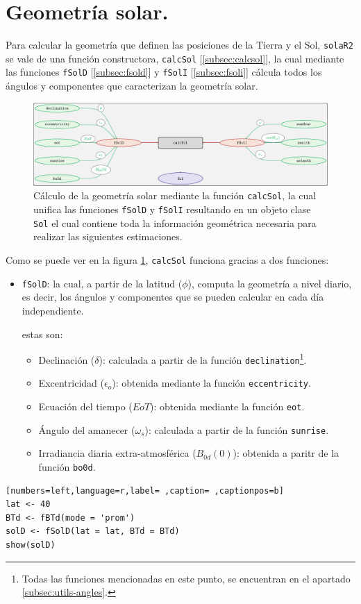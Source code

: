 \section{Geometría solar.}
\label{sec:org38b25ae}
\label{sec:geometria-solar}
Para calcular la geometría que definen las posiciones de la Tierra y el Sol, \texttt{solaR2} se vale de una función constructora, \texttt{calcSol} [\ref{subsec:calcsol}], la cual mediante las funciones \texttt{fSolD} [\ref{subsec:fsold}] y \texttt{fSolI} [\ref{subsec:fsoli}] cálcula todos los ángulos y componentes que caracterizan la geometría solar.
\begin{figure}[]
\centering
\includegraphics[keepaspectratio,width=\textwidth,height=0.5\textheight]{figuras/calcSol.pdf}
\caption{Cálculo de la geometría solar mediante la función \texttt{calcSol}, la cual unifica las funciones \texttt{fSolD} y \texttt{fSolI} resultando en un objeto clase \texttt{Sol} el cual contiene toda la información geométrica necesaria para realizar las siguientes estimaciones. \label{fig:calcSol}}
\end{figure}
Como se puede ver en la figura \ref{fig:calcSol}, \texttt{calcSol} funciona gracias a dos funciones:
\begin{itemize}
\item \texttt{fSolD}: la cual, a partir de la latitud (\(\phi\)), computa la geometría a nivel diario, es decir, los ángulos y componentes que se pueden calcular en cada día independiente.

estas son:
\begin{itemize}
\item Declinación (\(\delta\)): calculada a partir de la función \texttt{declination}\footnote{Todas las funciones mencionadas en este punto, se encuentran en el apartado \ref{subsec:utils-angles}.}.
\item Excentricidad (\(\epsilon_o\)): obtenida mediante la función \texttt{eccentricity}.
\item Ecuación del tiempo (\(EoT\)): obtenida mediante la función \texttt{eot}.
\item Ángulo del amanecer (\(\omega_s\)): calculada a partir de la función \texttt{sunrise}.
\item Irradiancia diaria extra-atmosférica (\(B_{0d}(0)\)): obtenida a paritr de la función \texttt{bo0d}.
\end{itemize}
\end{itemize}
\begin{lstlisting}[numbers=left,language=r,label= ,caption= ,captionpos=b]
lat <- 40
BTd <- fBTd(mode = 'prom')
solD <- fSolD(lat = lat, BTd = BTd)
show(solD)
\end{lstlisting}

